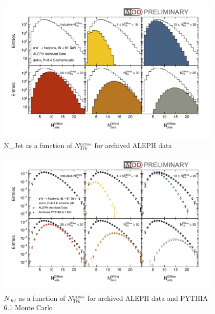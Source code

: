 \begin{figure}[!htb]
\begin{center}
\includegraphics[width=.45\textwidth]{../../Plotting/src/plots/multiPanel_nJets_nTrk.pdf}
\caption{N_{Jet} as a function of $N_{Trk}^_{Offline}$ for archived ALEPH data}
\label{fig:multiPanel_nJets_nTrk}
\end{center}
\end{figure}

\begin{figure}[!htb]
\begin{center}
\includegraphics[width=.45\textwidth]{../../Plotting/src/plots/multiPanel_nJets_nTrk_MC.pdf}
\caption{$N_{Jet}$ as a function of $N_{Trk}^_{Offline}$ for archived ALEPH data and PYTHIA 6.1 Monte Carlo}
\label{fig:multiPanel_nJets_nTrk_MC}
\end{center}
\end{figure}
